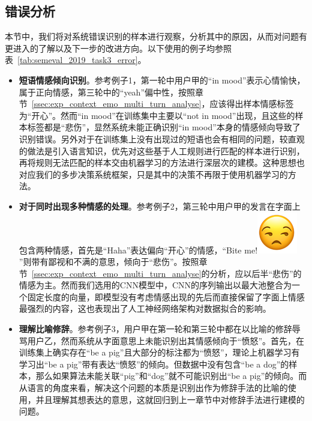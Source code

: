 \subsection{错误分析}
\label{ssec:exp_context_emo_error_analysis}

本节中，我们将对系统错误识别的样本进行观察，分析其中的原因，从而对问题有更进入的了解以及下一步的改进方向。以下使用的例子均参照表~\ref{tab:semeval_2019_task3_error}。

\begin{itemize}

\item {\bf 短语情感倾向识别}。参考例子1，第一轮中用户甲的“in mood”表示心情愉快，属于正向情感，第三轮中的“yeah”偏中性，按照章节~\ref{ssec:exp_context_emo_multi_turn_analyse}，应该得出样本情感标签为“开心”。然而“in mood”在训练集中主要以“not in mood”出现，且这些的样本标签都是“悲伤”，显然系统未能正确识别“in mood”本身的情感倾向导致了识别错误。另外对于在训练集上没有出现过的短语也会有相同的问题，较直观的做法是引入语言知识，优先对这些基于人工规则进行匹配的样本进行识别，再将规则无法匹配的样本交由机器学习的方法进行深层次的建模。这种思想也对应我们的多步决策系统框架，只是其中的决策不再限于使用机器学习的方法。

\item {\bf 对于同时出现多种情感的处理}。参考例子2，第三轮中用户甲的发言在字面上包含两种情感，首先是“Haha”表达偏向“开心”的情感，“Bite me!\includegraphics[height=1.5\fontcharht\font`\B]{img/emoji/speechless.png}”则带有鄙视和不满的意思，倾向于“悲伤”。按照章节~\ref{ssec:exp_context_emo_multi_turn_analyse}的分析，应以后半“悲伤”的情感为主。然而我们选用的CNN模型中，CNN的序列输出以最大池整合为一个固定长度的向量，即模型没有考虑情感出现的先后而直接保留了字面上情感最强烈的内容，这也表现出了人工神经网络架构对数据拟合的影响。

\item {\bf 理解比喻修辞}。参考例子3，用户甲在第一轮和第三轮中都在以比喻的修辞辱骂用户乙，然而系统从字面意思上未能识别出其情感倾向于“愤怒”。首先，在训练集上确实存在“be a pig”且大部分的标注都为“愤怒”，理论上机器学习有学习出“be a pig”带有表达“愤怒”的倾向。但数据中没有包含“be a dog”的样本，那么如果算法未能关联“pig”和“dog”就不可能识别出“be a pig”的倾向。而从语言的角度来看，解决这个问题的本质是识别出作为修辞手法的比喻的使用，并且理解其想表达的意思，这就回归到上一章节中对修辞手法进行建模的问题。


\end{itemize}
